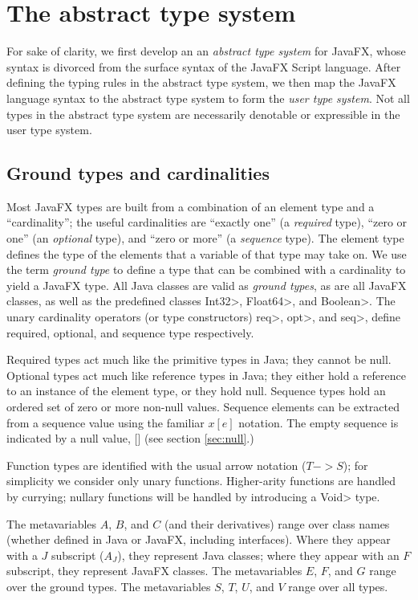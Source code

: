 \documentclass{article}
\newcommand{\sqb}{\texttt{[]}}
\begin{document}
\section{The abstract type system}

For sake of clarity, we first develop an an \emph{abstract type
system} for JavaFX, whose syntax is divorced from the surface syntax
of the JavaFX Script language.  After defining the typing rules in the
abstract type system, we then map the JavaFX language syntax to the
abstract type system to form the \emph{user type system}.  Not all
types in the abstract type system are necessarily denotable or
expressible in the user type system.

\subsection{Ground types and cardinalities}

Most JavaFX types are built from a combination of an element type and
a ``cardinality''; the useful cardinalities are ``exactly one'' (a
\emph{required} type), ``zero or one'' (an \emph{optional} type), and
``zero or more'' (a \emph{sequence} type).  The element type defines
the type of the elements that a variable of that type may take on.  We
use the term \emph{ground type} to define a type that can be combined
with a cardinality to yield a JavaFX type.  All Java classes are valid
as \emph{ground types}, as are all JavaFX classes, as well as the
predefined classes \<Int32>, \<Float64>, and \<Boolean>.  The unary
cardinality operators (or type constructors) \<req>, \<opt>, and
\<seq>, define required, optional, and sequence type respectively.

Required types act much like the primitive types in Java; they cannot
be null.  Optional types act much like reference types in Java; they
either hold a reference to an instance of the element type, or they
hold null.  Sequence types hold an ordered set of zero or more non-null values.  
Sequence elements can be extracted from a sequence value using the familiar
$x[e]$ notation.  The empty sequence is indicated by a null value, $\sqb$ (see section \ref{sec:null}.)  

Function types are identified with the usual arrow notation ($T ->
S$); for simplicity we consider only unary functions.  Higher-arity
functions are handled by currying; nullary functions will be handled
by introducing a \<Void> type.

The metavariables $A$, $B$, and $C$ (and their derivatives) range over
class names (whether defined in Java or JavaFX, including interfaces).  Where
they appear with a $J$ subscript ($A_J$), they represent Java classes; where they
appear with an $F$ subscript, they represent JavaFX classes.  
The metavariables $E$, $F$, and $G$ range over the ground types.  The
metavariables $S$, $T$, $U$, and $V$ range over all types.
\end{document}
